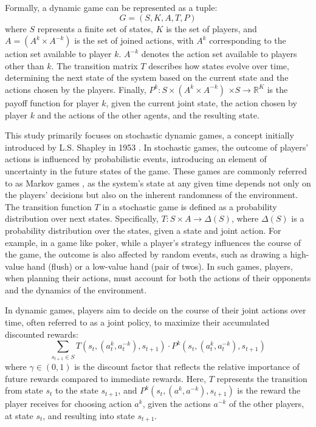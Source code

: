         \noindent
        Formally, a dynamic game can be represented as a tuple:
        \begin{equation}
            G = (S, K, A, T, P)
            \label{eq:dyngame}
        \end{equation}
        where $S$ represents a finite set of states, $K$ is the set of players, and $A = (A^k \times A^{-k})$ is the set of joined actions, with $A^k$ corresponding to the action set available to player $k$. $A^{-k}$ denotes the action set available to players other than $k$. The transition matrix $T$ describes how states evolve over time, determining the next state of the system based on the current state and the actions chosen by the players. Finally, $P^k: S \times (A^k \times A^{-k})$ \allowbreak $\times S \to \mathbb{R}^K$ is the payoff function for player $k$, given the current joint state, the action chosen by player $k$ and the actions of the other agents, and the resulting state.\tinydouble

        \noindent
        This study primarily focuses on stochastic dynamic games, a concept initially introduced by L.S. Shapley in 1953 \cite{Shapley1953StochasticG}. In stochastic games, the outcome of players' actions is influenced by probabilistic events, introducing an element of uncertainty in the future states of the game. These games are commonly referred to as Markov games \cite{Shoham_Leyton-Brown_2008}, as the system's state at any given time depends not only on the players' decisions but also on the inherent randomness of the environment. The transition function $T$ in a stochastic game is defined as a probability distribution over next states. Specifically, $T: S \times A \to \Delta(S)$, where $\Delta(S)$ is a probability distribution over the states, given a state and joint action. For example, in a game like poker, while a player's strategy influences the course of the game, the outcome is also affected by random events, such as drawing a high-value hand (flush) or a low-value hand (pair of twos). In such games, players, when planning their actions, must account for both the actions of their opponents and the dynamics of the environment.\tinydouble

        \noindent
        In dynamic games, players aim to decide on the course of their joint actions over time, often referred to as a joint policy, to maximize their accumulated discounted rewards:
        \begin{equation}
            \sum_{s_{t+1} \in S} T(s_t, (a_t^k, a_t^{-k}), s_{t+1}) \cdot P^k(s_t, (a_t^k, a_t^{-k}), s_{t+1})
            \label{eq:acc_rewards}
        \end{equation}      
        where $\gamma \in (0, 1)$ is the discount factor that reflects the relative importance of future rewards compared to immediate rewards. Here, $T$ represents the transition from state $s_t$ to the state $s_{t+1}$, and $P^k(s_{t}, (a^k, a^{-k}), s_{t+1})$ is the reward the player receives for choosing action $a^k$, given the actions $a^{-k}$ of the other players, at state $s_{t}$, and resulting into state $s_{t+1}$.

